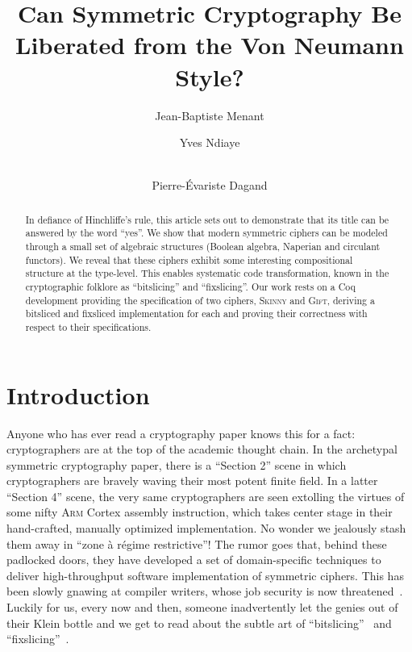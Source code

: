 \documentclass[draft,english]{jflart}
\title{Can Symmetric Cryptography Be Liberated from the Von Neumann
  Style?}
\author[1]{Jean-Baptiste Menant}
\author[2]{Yves Ndiaye}
\author[2,3]{\\Pierre-Évariste Dagand}
\affil[1]{École Normale Supérieure de Lyon}
\affil[2]{Université Paris Cité, IRIF}
\affil[3]{CNRS}
\newcommand{\Skinny}{\textsc{Skinny}}
\newcommand{\Gift}{\textsc{Gift}}
\begin{document}
\maketitle

\begin{abstract}

  In defiance of Hinchliffe's rule, this article sets out to
  demonstrate that its title can be answered by the word ``yes''. We
  show that modern symmetric ciphers can be modeled through a small
  set of algebraic structures (Boolean algebra, Naperian and circulant
  functors). We reveal that these ciphers exhibit some interesting
  compositional structure at the type-level. This enables systematic
  code transformation, known in the cryptographic folklore as
  ``bitslicing'' and ``fixslicing''. Our work rests on a Coq
  development providing the specification of two ciphers, \Skinny{} and
  \Gift{}, deriving a bitsliced and fixsliced implementation for each and
  proving their correctness with respect to their specifications.

\end{abstract}

\section{Introduction}


Anyone who has ever read a cryptography paper knows this for a fact:
cryptographers are at the top of the academic thought chain. In the
archetypal symmetric cryptography paper, there is a ``Section 2''
scene in which cryptographers are bravely waving their most potent
finite field. In a latter ``Section 4'' scene, the very same
cryptographers are seen extolling the virtues of some nifty
\textsc{Arm} Cortex assembly instruction, which takes center stage in
their hand-crafted, manually optimized implementation. No wonder we
jealously stash them away in ``zone à régime restrictive''! The rumor
goes that, behind these padlocked doors, they have developed a set of
domain-specific techniques to deliver high-throughput software
implementation of symmetric ciphers. This has been slowly gnawing at
compiler writers, whose job security is now
threatened~\citep{bernstein:death-compiler,venkatesh:compiler-security}.
Luckily for us, every now and then, someone inadvertently let the
genies out of their Klein bottle and we get to read about the subtle
art of ``bitslicing''~\citep{biham:DES} and
``fixslicing''~\citep{adominicai:fixslicing-gift,
  adomnicai:fixslicing-AES-like}.
\end{document}
